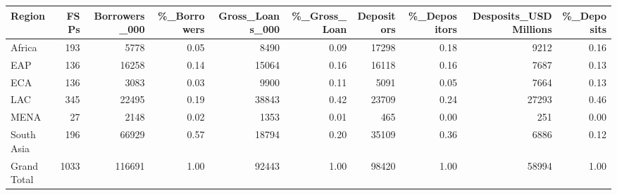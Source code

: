 \documentclass[a4paper,nobind]{templates/ociamthesis}
\begin{document}
\newpage

\begin{landscape}\begin{table}
\centering\begingroup\fontsize{8}{10}\selectfont

\begin{tabular}{lrrrrrrrrr}
\toprule
Region & FSPs & Borrowers\_000 & \%\_Borrowers & Gross\_Loans\_000 & \%\_Gross\_Loan & Depositors & \%\_Depositors & Desposits\_USDMillions & \%\_Deposits\\
\midrule
Africa & 193 & 5778 & 0.05 & 8490 & 0.09 & 17298 & 0.18 & 9212 & 0.16\\
EAP & 136 & 16258 & 0.14 & 15064 & 0.16 & 16118 & 0.16 & 7687 & 0.13\\
ECA & 136 & 3083 & 0.03 & 9900 & 0.11 & 5091 & 0.05 & 7664 & 0.13\\
LAC & 345 & 22495 & 0.19 & 38843 & 0.42 & 23709 & 0.24 & 27293 & 0.46\\
MENA & 27 & 2148 & 0.02 & 1353 & 0.01 & 465 & 0.00 & 251 & 0.00\\
\addlinespace
South Asia & 196 & 66929 & 0.57 & 18794 & 0.20 & 35109 & 0.36 & 6886 & 0.12\\
Grand Total & 1033 & 116691 & 1.00 & 92443 & 1.00 & 98420 & 1.00 & 58994 & 1.00\\
\bottomrule
\end{tabular}
\endgroup{}
\end{table}
\end{landscape}

\newpage
\end{document}
